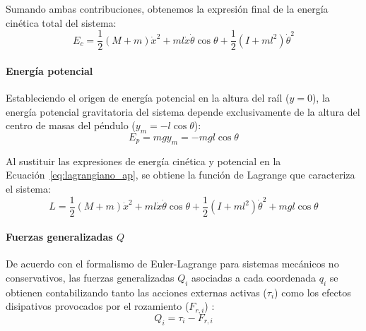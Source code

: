\documentclass[11pt,fleqn]{book} %
\begin{document}
Sumando ambas contribuciones, obtenemos la expresión final de la energía cinética total del sistema:
\begin{equation}
	E_c = \frac{1}{2}(M + m)\dot{x}^2 + ml\dot{x}\dot{\theta}\cos\theta + \frac{1}{2}(I + ml^2)\dot{\theta}^2
\end{equation}

\paragraph{Energía potencial}
Estableciendo el origen de energía potencial en la altura del raíl ($y = 0$), la energía potencial gravitatoria del sistema depende exclusivamente de la altura del centro de masas del péndulo ($y_m = -l\cos\theta$):
\begin{equation}
	E_p = m g y_m = -mgl\cos\theta
\end{equation}

Al sustituir las expresiones de energía cinética y potencial en la Ecuación~\ref{eq:lagrangiano_ap}, se obtiene la función de Lagrange que caracteriza el sistema:
\begin{equation}
	L = \frac{1}{2}(M + m)\dot{x}^2 + ml\dot{x}\dot{\theta}\cos\theta + \frac{1}{2}(I + ml^2)\dot{\theta}^2 + mgl\cos\theta
\end{equation}

\paragraph{Fuerzas generalizadas $Q$}
De acuerdo con el formalismo de Euler-Lagrange para sistemas mecánicos no conservativos, las fuerzas generalizadas $Q_i$ asociadas a cada coordenada $q_i$ se obtienen contabilizando tanto las acciones externas activas ($\tau_i$) como los efectos disipativos provocados por el rozamiento ($F_{r,i}$) \cite{Penarrocha_Tema6}:
\begin{equation}
	Q_i = \tau_i - F_{r,i}
\end{equation}
\end{document}
